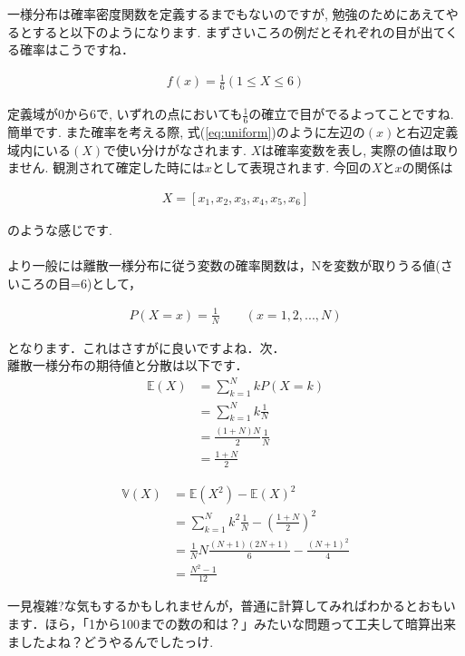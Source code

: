 \documentclass[11pt,a4paper]{ujreport} 	%
\begin{document}
一様分布は確率密度関数を定義するまでもないのですが, 勉強のためにあえてやるとすると以下のようになります. まずさいころの例だとそれぞれの目が出てくる確率はこうですね．

\begin{align}
\label{eq:uniform}
f(x) = \frac{1}{6} (1 \leq X \leq 6)
\end{align}

定義域が0から6で, いずれの点においても$\frac{1}{6}$の確立で目がでるよってことですね. 簡単です. また確率を考える際, 式(\ref{eq:uniform})のように左辺の$(x)$と右辺定義域内にいる$(X)$で使い分けがなされます. $X$は確率変数を表し, 実際の値は取りません. 観測されて確定した時には$x$として表現されます. 今回の$X$と$x$の関係は

\begin{align}
X = [x_1, x_2, x_3, x_4, x_5, x_6]
\end{align}

のような感じです. \\
\\

より一般には離散一様分布に従う変数の確率関数は，Nを変数が取りうる値(さいころの目=6)として，

\begin{align}
P(X=x) = \frac{1}{N} \qquad (x=1,2,...,N)
\end{align}

となります．これはさすがに良いですよね．次．\\

離散一様分布の期待値と分散は以下です．\\

\begin{align}
\mathbb{E}(X) &= \sum_{k=1}^N{kP(X=k)}\\
&=\sum_{k=1}^N{k\frac{1}{N}}\\
&= \frac{(1+N)N}{2}\frac{1}{N}\\
&= \frac{1+N}{2}
\end{align}

\begin{align}
\mathbb{V}(X) &= \mathbb{E}(X^2) - \mathbb{E}(X)^2\\
&= \sum_{k=1}^N k^2 \frac{1}{N} - {(\frac{1+N}{2})}^2\\
&= \frac{1}{N}N\frac{(N+1)(2N+1)}{6}-\frac{(N+1)^2}{4}\\
&= \frac{N^2-1}{12}
\end{align}

一見複雑?な気もするかもしれませんが，普通に計算してみればわかるとおもいます．ほら，「1から100までの数の和は？」みたいな問題って工夫して暗算出来ましたよね？どうやるんでしたっけ.\\
\\
\end{document}
